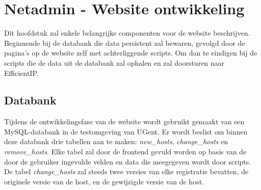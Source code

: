 
\chapter{Netadmin - Website ontwikkeling}%
\label{ch:netadmin-website-ontwikkeling}
Dit hoofdstuk zal enkele belangrijke componenten voor de website beschrijven. Beginnende bij de databank die data persistent zal bewaren, gevolgd door de pagina's op de website zelf met achterliggende scripts. Om dan te eindigen bij de scripts die de data uit de databank zal ophalen en zal doorsturen naar EfficientIP.

\section{Databank}
\label{databank}
Tijdens de ontwikkelingsfase van de website wordt gebruikt gemaakt van een MySQL-databank in de testomgeving van UGent. Er wordt beslist om binnen deze databank drie tabellen aan te maken: \textit{new\_hosts}, \textit{change\_hosts} en \textit{remove\_hosts}. Elke tabel zal door de frontend gevuld worden op basis van de door de gebruiker ingevulde velden en data die meegegeven wordt door scripts.
De tabel \textit{change\_hosts} zal steeds twee versies van elke registratie bevatten, de originele versie van de host, en de gewijzigde versie van de host.

